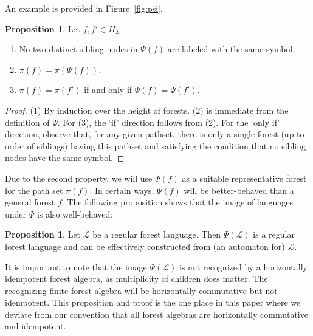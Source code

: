 \documentclass[sigplan,9pt]{acmart}\settopmatter{printfolios=true,printccs=false,printacmref=false}
\newcounter{thm}
\newcounter{theorem}
\theoremstyle{definition}
\newtheorem{prop}[thm]{Proposition}
\newcommand{\La}[0]{{\mathcal{L}}}
\begin{document}
An example is provided in Figure~\ref{fig:psi}.

\begin{prop}\label{prop:psi}
Let $f, f' \in H_\Sigma$.
\begin{enumerate}
\item No two distinct sibling nodes in $\Psi(f)$ are labeled with the same symbol.

\item $\pi(f) = \pi(\Psi(f))$.

\item $\pi(f) = \pi(f')$ if and only if $\Psi(f) = \Psi(f')$.
\end{enumerate}
\end{prop}

\begin{proof}
(1) By induction over the height of forests.
(2) is immediate from the definition of $\Psi$.
For (3), the `if' direction follows from (2). For the `only if' direction, observe that, for any given pathset, there is only a single forest (up to order of siblings) having this pathset and satisfying the condition that no sibling nodes have the same symbol.
\end{proof}

Due to the second property, we will use $\Psi(f)$ as a suitable representative forest for the path set $\pi(f)$.
In certain ways, $\Psi(f)$ will be better-behaved than a general forest $f$.
The following proposition shows that the image of languages under $\Psi$ is also well-behaved:

\begin{prop}\label{prop:psi-reg}
Let $\La$ be a regular forest language. Then $\Psi(\La)$ is a regular forest language and can be effectively constructed from (an automaton for) $\La$.
\end{prop}

It is important to note that the image $\Psi(\La)$ is not recognized by a horizontally idempotent forest algebra, as multiplicity of children does matter. The recognizing finite forest algebra will be horizontally commutative but not idempotent.
This proposition and proof is the one place in this paper where we deviate from our convention that all forest algebras are horizontally commutative and idempotent.
\end{document}
